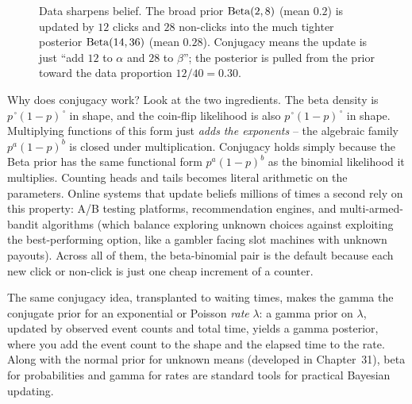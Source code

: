 \begin{figure}[H]
\centering
{}
\caption{Data sharpens belief. The broad prior $\operatorname{Beta}(2,8)$ (mean $0.2$) is updated
by $12$ clicks and $28$ non-clicks into the much tighter posterior
$\operatorname{Beta}(14,36)$ (mean $0.28$). Conjugacy means the update is just ``add $12$ to
$\alpha$ and $28$ to $\beta$''; the posterior is pulled from the prior toward the
data proportion $12/40=0.30$.}
\label{ch11:fig-beta-update}
\end{figure}
\begin{happeningbox}
Why does conjugacy work? Look at the two ingredients. The beta density is
$p^{\,\square}(1-p)^{\,\square}$ in shape, and the coin-flip likelihood is also
$p^{\,\square}(1-p)^{\,\square}$ in shape. Multiplying functions of this form
just \emph{adds the exponents} -- the algebraic family $p^a(1-p)^b$ is closed
under multiplication. Conjugacy holds simply because the Beta prior has the same functional form $p^a(1-p)^b$
as the binomial likelihood it multiplies. Counting heads and tails becomes literal arithmetic on
the parameters. Online systems that update beliefs millions of times a second
rely on this property: A/B testing platforms, recommendation engines, and
multi-armed-bandit algorithms (which balance exploring unknown choices against
exploiting the best-performing option, like a gambler facing slot machines with
unknown payouts). Across all of them, the beta-binomial pair is the default
because each new click or non-click is just one cheap increment of a counter.
\end{happeningbox}
\begin{connectionbox}
The same conjugacy idea, transplanted to waiting times, makes the gamma the
conjugate prior for an exponential or Poisson \emph{rate} $\lambda$: a gamma
prior on $\lambda$, updated by observed event counts and total time, yields a
gamma posterior, where you add the event count to the shape and the elapsed time
to the rate. Along with the normal prior for unknown means (developed in
Chapter~31), beta for probabilities and gamma for rates are standard tools for
practical Bayesian updating.
\end{connectionbox}

